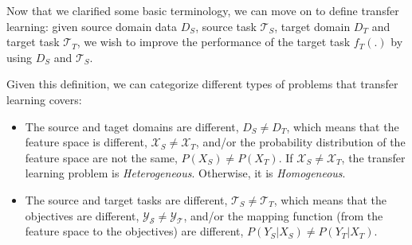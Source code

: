   \par Now that we clarified some basic terminology, we can move on to define transfer learning: given source domain data $D_S$, source task $\mathcal{T}_S$,  target domain $D_T$ and target task $\mathcal{T}_T$, we wish to improve the performance of the target task $f_T(.)$ by using $D_S$ and $\mathcal{T}_S$.

  \par Given this definition, we can categorize different types of problems that transfer learning covers:

  \begin{itemize}
      \item The source and taget domains are different, $D_S \neq D_T$, which means that the feature space is different, $\mathcal{X}_S \neq \mathcal{X}_T$, and/or the probability distribution of the feature space are not the same, $P(X_S) \neq P(X_T)$. If $\mathcal{X}_S \neq \mathcal{X}_T$, the transfer learning problem is \textit{Heterogeneous}. Otherwise, it is \textit{Homogeneous}.

      \item The source and target tasks are different, $\mathcal{T}_S \neq \mathcal{T}_T$, which means that the objectives are different, $\mathcal{Y_S} \neq \mathcal{Y_T}$, and/or the mapping function (from the feature space to the objectives) are different, $P(Y_S|X_S) \neq P(Y_T|X_T)$.
  \end{itemize}

